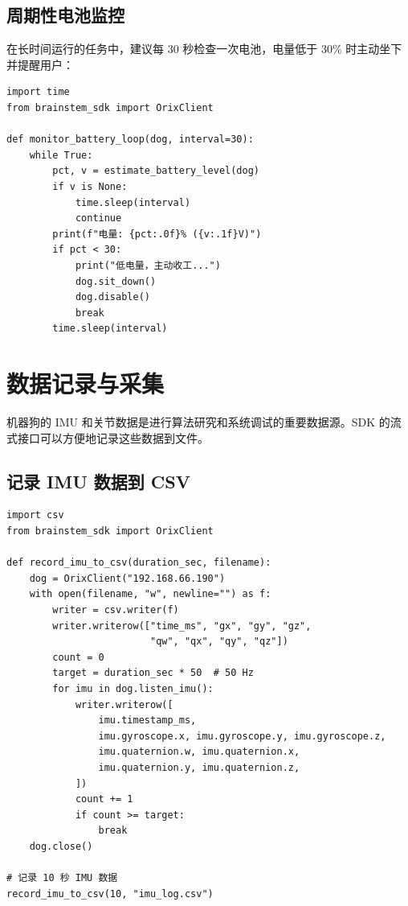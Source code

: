 \documentclass[a4paper,11pt,openany]{book}
\begin{document}
\subsection{周期性电池监控}

在长时间运行的任务中，建议每 30 秒检查一次电池，电量低于 30\% 时主动坐下并提醒用户：

\begin{lstlisting}[style=python]
import time
from brainstem_sdk import OrixClient

def monitor_battery_loop(dog, interval=30):
    while True:
        pct, v = estimate_battery_level(dog)
        if v is None:
            time.sleep(interval)
            continue
        print(f"电量: {pct:.0f}% ({v:.1f}V)")
        if pct < 30:
            print("低电量，主动收工...")
            dog.sit_down()
            dog.disable()
            break
        time.sleep(interval)
\end{lstlisting}

\section{数据记录与采集}

机器狗的 IMU 和关节数据是进行算法研究和系统调试的重要数据源。SDK 的流式接口可以方便地记录这些数据到文件。

\subsection{记录 IMU 数据到 CSV}

\begin{lstlisting}[style=python]
import csv
from brainstem_sdk import OrixClient

def record_imu_to_csv(duration_sec, filename):
    dog = OrixClient("192.168.66.190")
    with open(filename, "w", newline="") as f:
        writer = csv.writer(f)
        writer.writerow(["time_ms", "gx", "gy", "gz",
                         "qw", "qx", "qy", "qz"])
        count = 0
        target = duration_sec * 50  # 50 Hz
        for imu in dog.listen_imu():
            writer.writerow([
                imu.timestamp_ms,
                imu.gyroscope.x, imu.gyroscope.y, imu.gyroscope.z,
                imu.quaternion.w, imu.quaternion.x,
                imu.quaternion.y, imu.quaternion.z,
            ])
            count += 1
            if count >= target:
                break
    dog.close()

# 记录 10 秒 IMU 数据
record_imu_to_csv(10, "imu_log.csv")
\end{lstlisting}
\end{document}

